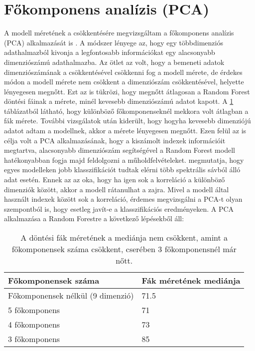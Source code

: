 \section{Főkomponens analízis (PCA)}

A modell méretének a csökkentésére megvizsgáltam a főkomponens analízis (PCA) alkalmazását is \cite{pca2010}. A módszer lényege az, hogy egy többdimenziós adathalmazból kivonja a legfontosabb információkat egy alacsonyabb dimenziószámú adathalmazba. Az ötlet az volt, hogy a bemeneti adatok dimenziószámának a csökkentésével csökkenni fog a modell mérete, de érdekes módon a modell mérete nem csökkent a dimenziószám csökkentésével, helyette lényegesen megnőtt. Ezt az is tükrözi, hogy megnőtt átlagosan a Random Forest döntési fáinak a mérete, minél kevesebb dimenziószámú adatot kapott. A \ref{tab:increase-in-model-size} táblázatból látható, hogy különböző főkomponenseknél mekkora volt átlagban a fák mérete. További vizsgálatok után kiderült, hogy hogyha kevesebb dimenziójú adatot adtam a modellnek, akkor a mérete lényegesen megnőtt. Ezen felül az is célja volt a PCA alkalmazásának, hogy a kiszámolt indexek információit megtartva, alacsonyabb dimenziószám segítségével a Random Forest modell hatékonyabban fogja majd feldolgozni a műholdfelvételeket. \cite{Howley2005} megmutatja, hogy egyes modelleken jobb klasszifikációt tudtak elérni több spektrális sávból álló adat esetén. Ennek az az oka, hogy ha igen sok a korreláció a különböző dimenziók között, akkor a modell rátanulhat a zajra. Mivel a modell által használt indexek között sok a korreláció, érdemes megvizsgálni a PCA-t olyan szempontból is, hogy esetleg javít-e a klasszifikációs eredményeken. A PCA alkalmazása a Random Forestre a következő lépésekből áll:

\begin{table}[H]
	\centering
	\begin{tabular}{ | p{} | p{} | }
		\hline
		\textbf{Főkomponensek száma} & \textbf{Fák méretének mediánja} \\
		\hline \hline
		Főkomponensek nélkül (9 dimenzió) & 71.5 \\
		\hline
    5 főkomponens & 71 \\
		\hline
		4 főkomponens & 73\\
		\hline
    3 főkomponens & 85 \\
    \hline
	\end{tabular}
	\caption{A döntési fák méretének a mediánja nem csökkent, amint a főkomponensek száma csökkent, cserében 3 főkomponensnél már nőtt.}
	\label{tab:increase-in-model-size}
\end{table}

